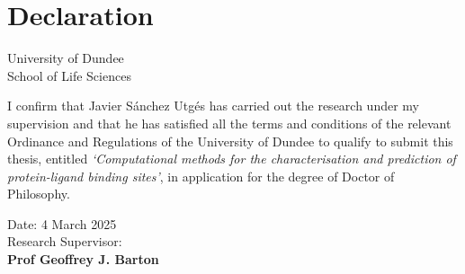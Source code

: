 \chapter*{Declaration} %

\begin{center}
    \LARGE University of Dundee\\[1cm]
    \LARGE School of Life Sciences\\[2cm]
\end{center}

I confirm that Javier Sánchez Utgés has carried out the research under my supervision and that he has satisfied all the terms and conditions of the relevant Ordinance and Regulations of the University of Dundee to qualify to submit this thesis, entitled \textit{`Computational methods for the characterisation and prediction of protein-ligand binding sites'}, in application for the degree of Doctor of Philosophy.

\vfill

\begin{flushright}
    Date: 4 March 2025\\[1.5cm]
    Research Supervisor: \underline{\hspace{6cm}}\\[1cm]
    \textbf{Prof Geoffrey J. Barton}
\end{flushright}